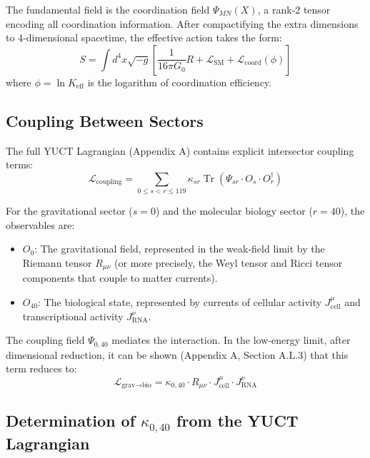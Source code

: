 \documentclass[12pt,a4paper]{article}
\theoremstyle{remark}
\newcommand{\Keff}{K_{\mathrm{eff}}}
\begin{document}
	The fundamental field is the coordination field \(\Psi_{MN}(X)\), a rank-2 tensor encoding all coordination information. After compactifying the extra dimensions to 4‑dimensional spacetime, the effective action takes the form:
	\begin{equation}
		S = \int d^4x \sqrt{-g} \left[ \frac{1}{16\pi G_0} R + \mathcal{L}_{\text{SM}} + \mathcal{L}_{\text{coord}}(\phi) \right]
		\label{eq:action}
	\end{equation}
	where \(\phi = \ln \Keff\) is the logarithm of coordination efficiency.
	
	\subsection{Coupling Between Sectors}
	
	The full YUCT Lagrangian (Appendix A) contains explicit intersector coupling terms:
	\begin{equation}
		\mathcal{L}_{\text{coupling}} = \sum_{0 \le s < r \le 119} \kappa_{sr} \operatorname{Tr}(\Psi_{sr} \cdot O_s \cdot O_r^\dagger)
		\label{eq:full-coupling}
	\end{equation}
	
	For the gravitational sector (\(s=0\)) and the molecular biology sector (\(r=40\)), the observables are:
	\begin{itemize}
		\item \(O_0\): The gravitational field, represented in the weak‑field limit by the Riemann tensor \(R_{\mu\nu}\) (or more precisely, the Weyl tensor and Ricci tensor components that couple to matter currents).
		\item \(O_{40}\): The biological state, represented by currents of cellular activity \(J_{\text{cell}}^\mu\) and transcriptional activity \(J_{\text{RNA}}^\nu\).
	\end{itemize}
	
	The coupling field \(\Psi_{0,40}\) mediates the interaction. In the low‑energy limit, after dimensional reduction, it can be shown (Appendix A, Section A.L.3) that this term reduces to:
	\begin{equation}
		\mathcal{L}_{\text{grav}\to\text{bio}} = \kappa_{0,40} \cdot R_{\mu\nu} \cdot J_{\text{cell}}^\mu \cdot J_{\text{RNA}}^\nu
		\label{eq:coupling-raw}
	\end{equation}
	
	\subsection{Determination of \(\kappa_{0,40}\) from the YUCT Lagrangian}
	
\end{document}

